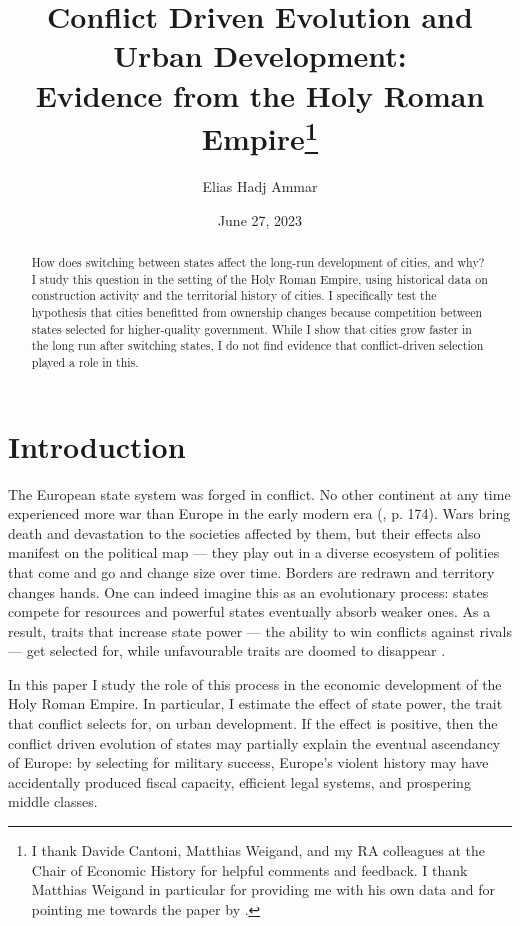 \documentclass[11pt, a4paper]{article}
\title{Conflict Driven Evolution and Urban Development: \\ Evidence from the Holy Roman Empire\footnote{
I thank Davide Cantoni, Matthias Weigand, and my RA colleagues at the Chair of Economic History for helpful comments and feedback. I thank Matthias Weigand in particular for providing me with his own data and for pointing me towards the paper by \cite{schoenholzer2022}.
}
}
\author{Elias Hadj Ammar}
\date{June 27, 2023}
\begin{document}
\onehalfspacing
\maketitle
\thispagestyle{empty}

\begin{abstract}
How does switching between states affect the long-run development of cities, and why? I study this question in the setting of the Holy Roman Empire, using historical data on construction activity and the territorial history of cities. I specifically test the hypothesis that cities benefitted from ownership changes because competition between states selected for higher-quality government. While I show that cities grow faster in the long run after switching states, I do not find evidence that conflict-driven selection played a role in this.
\end{abstract}

\newpage

\setcounter{page}{1}
\doublespacing



\section{Introduction}



The European state system was forged in conflict. No other continent at any time experienced more war than Europe in the early modern era (\citealp{voigtlnder2013}, p. 174). Wars bring death and devastation to the societies affected by them, but their effects also manifest on the political map --- they play out in a diverse ecosystem of polities that come and go and change size over time. Borders are redrawn and territory changes hands. One can indeed imagine this as an evolutionary process: states compete for resources and powerful states eventually absorb weaker ones. As a result, traits that increase state power --- the ability to win conflicts against rivals --- get selected for, while unfavourable traits are doomed to disappear \citep{levine2021}.

In this paper I study the role of this process in the economic development of the Holy Roman Empire. In particular, I estimate the effect of state power, the trait that conflict selects for, on urban development. If the effect is positive, then the conflict driven evolution of states may partially explain the eventual ascendancy of Europe: by selecting for military success, Europe's violent history may have accidentally produced fiscal capacity, efficient legal systems, and prospering middle classes.
\end{document}
